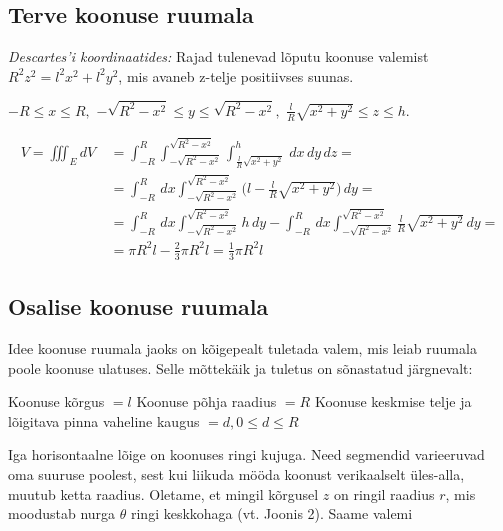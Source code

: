 \documentclass[a4paper]{article}
\begin{document}
\subsection*{Terve koonuse ruumala}

\begin{flushleft}
\textit{Descartes'i koordinaatides:} Rajad tulenevad lõputu koonuse valemist $R^2 z^2=l^2 x^2 + l^2 y^2$, mis avaneb z-telje positiivses suunas.
\begin{center}
$-R \leq x \leq R,$
\break
$-\sqrt{R^2-x^2} \leq y \leq \sqrt{R^2-x^2},$
\break
$ \frac{l}{R}\sqrt{x^2+y^2}\leq z \leq h.$
\end{center}
\end{flushleft}



\begin{equation} 
\begin{split}
V = \iiint_E dV\ & = \int_{-R}^{R}\int_{-\sqrt{R^2-x^2}}^{\sqrt{R^2-x^2}}\int_{\frac{l}{R}\sqrt{x^2+y^2}}^{h} \,dx\,dy\,dz = \\ &= \int_{-R}^{R} \,dx \int_{-\sqrt{R^2-x^2}}^{\sqrt{R^2-x^2}}\bigg(l - \frac{l}{R}\sqrt{x^2+y^2}\bigg) \,dy  = \\ & = \int_{-R}^{R} \,dx \int_{-\sqrt{R^2-x^2}}^{\sqrt{R^2-x^2}} h \,dy - \int_{-R}^{R} \,dx \int_{-\sqrt{R^2-x^2}}^{\sqrt{R^2-x^2}}\frac{l}{R}\sqrt{x^2+y^2} \,dy = \\ & = \pi R^2 l - \frac{2}{3} \pi R^2 l = \frac{1}{3} \pi R^2 l
\end{split}
\end{equation}

\subsection*{Osalise koonuse ruumala}

 Idee koonuse ruumala jaoks on kõigepealt tuletada valem, mis leiab ruumala poole koonuse ulatuses. Selle mõttekäik ja tuletus on sõnastatud järgnevalt:

\begin{center}
Koonuse kõrgus $= l$
\break
Koonuse põhja raadius $= R$
\break
Koonuse keskmise telje ja lõigitava pinna vaheline kaugus $= d, 0 \leq d \leq R$
\end{center}


\begin{flushleft}
Iga horisontaalne lõige on koonuses ringi kujuga. Need segmendid varieeruvad oma suuruse poolest, sest kui liikuda mööda koonust verikaalselt üles-alla, muutub ketta raadius. Oletame, et mingil kõrgusel $z$ on ringil raadius $r$, mis moodustab nurga $\theta$ ringi keskkohaga (vt. Joonis 2). Saame valemi
\end{flushleft}
\end{document}
